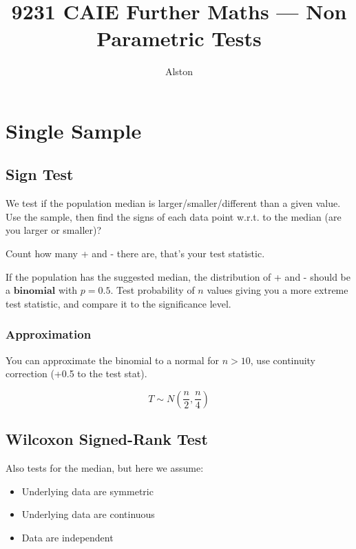 \documentclass{article}
\title{9231 CAIE Further Maths — Non Parametric Tests}
\author{Alston}
\date{}
\theoremstyle{mytheoremstyle}
\theoremstyle{mytheoremstyle}
\theoremstyle{myproblemstyle}
\begin{document}
    \maketitle

    \section{Single Sample}

    \subsection{Sign Test}

    We test if the population median is larger/smaller/different than a given value. Use the sample, then find the signs of each data point w.r.t. to the median (are you larger or smaller)?

    Count how many + and - there are, that's your test statistic. 

    If the population has the suggested median, the distribution of + and - should be a $\textbf{binomial}$ with $p=0.5$. Test probability of $n$ values giving you a more extreme test statistic, and compare it to the significance level.

    \subsubsection{Approximation}
    You can approximate the binomial to a normal for $n > 10$, use continuity correction (+0.5 to the test stat).
    \begin{theorem}

        \[T \sim N\left(\frac{n}{2}, \frac{n}{4}\right)\]
        
    \end{theorem}

    \subsection{Wilcoxon Signed-Rank Test}
    Also tests for the median, but here we assume: 
    \begin{itemize}
        \item Underlying data are symmetric
        \item Underlying data are continuous
        \item Data are independent
    \end{itemize}
\end{document}
